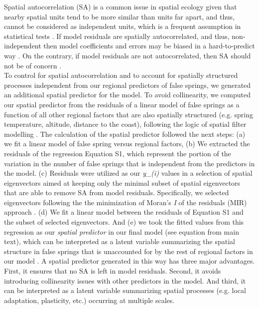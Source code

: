 \documentclass{article}\usepackage[]{graphicx}\usepackage[]{color}
\begin{document}
{Spatial autocorrelation (SA) is a common issue in spatial ecology given that nearby spatial units tend to be more similar than units far apart, and thus, cannot be considered as independent units, which is a frequent assumption in statistical tests \citep{diniz2003spatial}. If model residuals are spatially autocorrelated, and thus, non-independent then model coefficients and errors may be biased in a hard-to-predict way \citep{mauricio2009coefficient}. On the contrary, if model residuals are not autocorrelated, then SA should not be of concern \citep{hawkins2012eight}.\\

To control for spatial autocorrelation and to account for spatially structured processes independent from our regional predictors of false springs, we generated an additional spatial predictor for the model. To avoid collinearity, we computed our spatial predictor from the residuals of a linear model of false springs as a function of all other regional factors that are also spatially structured (e.g. spring temperature, altitude, distance to the coast), following the logic of spatial filter modelling \citep{diniz2005modelling}. The calculation of the spatial predictor followed the next steps: (a) we fit a linear model of false spring versus regional factors, (b) We extracted the residuals of the regression Equation S1, which represent the portion of the variation in the number of false springs that is independent from the predictors in the model. (c) Residuals were utilized as our \textit{y\_(i)} values in a selection of spatial eigenvectors aimed at keeping only the minimal subset of spatial eigenvectors that are able to remove SA from model residuals. Specifically, we selected eigenvectors following the the minimization of Moran's \textit{I} of the residuals (MIR) approach \citep{griffith2006spatial,diniz2012selection,Baumen2017}. (d) We fit a linear model between the residuals of Equation S1 and the subset of selected eigenvectors. And (e) we took the fitted values from this regression as our \emph{spatial predictor} in our final model (see equation from main text), which can be interpreted as a latent variable summarizing the spatial structure in false springs that is unaccounted for by the rest of regional factors in our model \citep{morales2012imprint}. A spatial predictor generated in this way has three major advantages. First, it ensures that no SA is left in model residuals. Second, it avoids introducing collinearity issues with other predictors in the model. And third, it can be interpreted as a latent variable summarizing spatial processes (e.g. local adaptation, plasticity, etc.) occurring at multiple scales.

}
\end{document}
